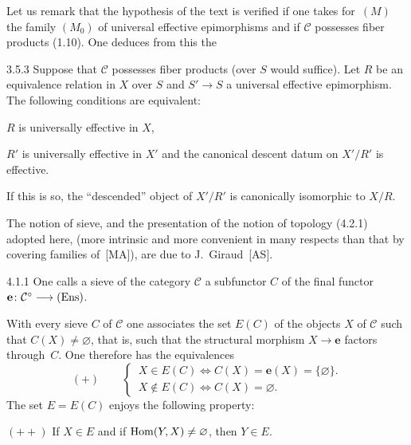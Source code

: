 Let us remark that the hypothesis of the text is verified if one takes
for~\((M)\) the family \((M_{0})\) of universal effective epimorphisms and
if \(\mathcal{C}\) possesses fiber products (1.10).
One deduces from this the

\begin{corollary}{3.5.3}
\label{IV.3.5.3}
Suppose that \(\mathcal{C}\) possesses fiber products (over \(S\) would
suffice). Let \(R\) be an equivalence relation in \(X\) over \(S\) and
\(S'\to S\) a universal effective epimorphism. The following conditions
are equivalent:
\begin{enumeratei}
\item \(R\) is universally effective in \(X\),
\item \(R'\) is universally effective in \(X'\) and the canonical descent
datum on \(X'/R'\) is effective.
\end{enumeratei}
If this is so, the ``descended'' object of \(X'/R'\) is canonically
isomorphic to \(X/R\).
\end{corollary}

\label{IV.sec.4}

The notion of sieve, and the presentation of the notion of topology
(4.2.1) adopted here, (more intrinsic and more convenient in many respects
than that by covering families of~[MA]), are due to J.~Giraud~[AS].

\label{IV.sec.4.1}

\begin{definition}{4.1.1}
\label{IV.4.1.1}
One calls a sieve of the category \(\mathcal{C}\) a subfunctor \(C\) of the
final functor \(\mathbf{e}\colon\mathcal{C}^{\circ}\longrightarrow\textup{(Ens)}\).
\end{definition}

With every sieve \(C\) of \(\mathcal{C}\) one associates the set \(E(C)\) of
the objects \(X\) of \(\mathcal{C}\) such that \(C(X)\neq\varnothing\), that
is, such that the structural morphism \(X\to\mathbf{e}\) factors
through~\(C\). One therefore has the equivalences
\[
(+)\qquad
\begin{cases}
\,X\in E(C)\iff C(X)=\mathbf{e}(X)=\{\varnothing\}.\\
\,X\notin E(C)\iff C(X)=\varnothing.
\end{cases}
\]
The set \(E=E(C)\) enjoys the following property:

\par\smallskip\noindent
\((++)\)\qquad
If \(X\in E\) and if \(\operatorname{Hom}(Y,X)\neq\varnothing\), then \(Y\in E\).

